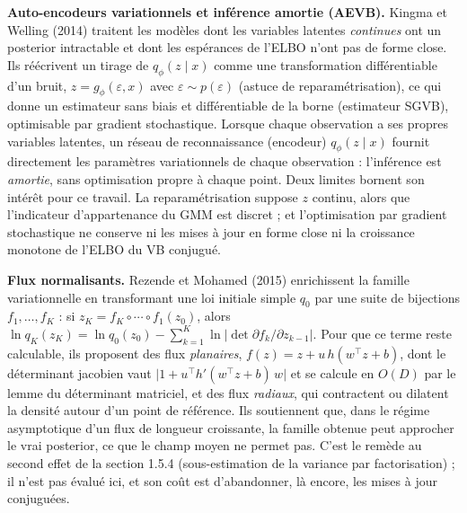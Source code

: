 \textbf{Auto-encodeurs variationnels et inférence amortie (AEVB). }Kingma et Welling (2014) traitent les modèles dont les variables latentes \emph{continues} ont un posterior intractable et dont les espérances de l'ELBO n'ont pas de forme close. Ils réécrivent un tirage de $q_\phi(z \mid x)$ comme une transformation différentiable d'un bruit, $z = g_\phi(\varepsilon, x)$ avec $\varepsilon \sim p(\varepsilon)$ (astuce de reparamétrisation), ce qui donne un estimateur sans biais et différentiable de la borne (estimateur SGVB), optimisable par gradient stochastique. Lorsque chaque observation a ses propres variables latentes, un réseau de reconnaissance (encodeur) $q_\phi(z \mid x)$ fournit directement les paramètres variationnels de chaque observation : l'inférence est \emph{amortie}, sans optimisation propre à chaque point. Deux limites bornent son intérêt pour ce travail. La reparamétrisation suppose $z$ continu, alors que l'indicateur d'appartenance du GMM est discret ; et l'optimisation par gradient stochastique ne conserve ni les mises à jour en forme close ni la croissance monotone de l'ELBO du VB conjugué.

\textbf{Flux normalisants. }Rezende et Mohamed (2015) enrichissent la famille variationnelle en transformant une loi initiale simple $q_0$ par une suite de bijections $f_1, \ldots, f_K$ : si $z_K = f_K \circ \cdots \circ f_1(z_0)$, alors $\ln q_K(z_K) = \ln q_0(z_0) - \sum_{k=1}^K \ln \lvert \det \partial f_k / \partial z_{k-1} \rvert$. Pour que ce terme reste calculable, ils proposent des flux \emph{planaires}, $f(z) = z + u\,h(w^\top z + b)$, dont le déterminant jacobien vaut $\lvert 1 + u^\top h'(w^\top z + b)\,w \rvert$ et se calcule en $O(D)$ par le lemme du déterminant matriciel, et des flux \emph{radiaux}, qui contractent ou dilatent la densité autour d'un point de référence. Ils soutiennent que, dans le régime asymptotique d'un flux de longueur croissante, la famille obtenue peut approcher le vrai posterior, ce que le champ moyen ne permet pas. C'est le remède au second effet de la section 1.5.4 (sous-estimation de la variance par factorisation) ; il n'est pas évalué ici, et son coût est d'abandonner, là encore, les mises à jour conjuguées.

